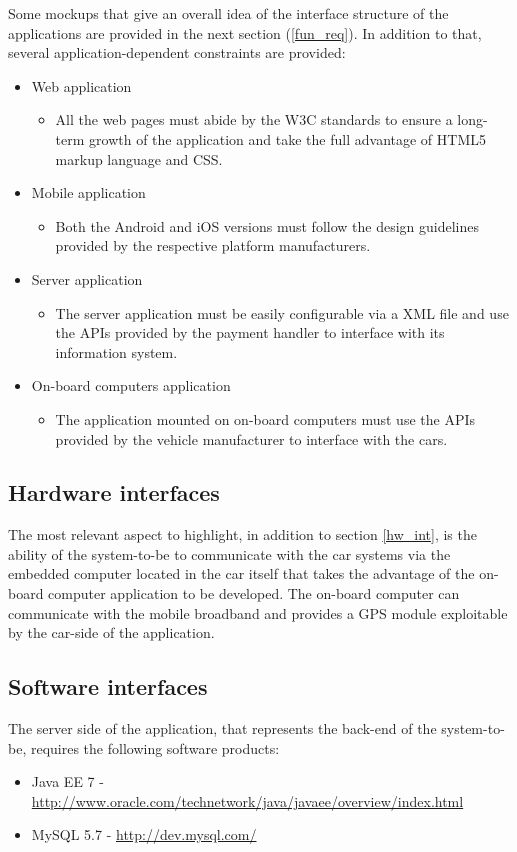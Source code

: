 Some mockups that give an overall idea of the interface structure of the applications are provided in the next section (\ref{fun_req}).
In addition to that, several application-dependent constraints are provided:
\begin{itemize}
\item Web application
	\begin{itemize}
	\item[] All the web pages must abide by the W3C standards to ensure a long-term growth of the application and take the full advantage of HTML5 markup language and CSS.
	\end{itemize}
\item Mobile application
	\begin{itemize}
	\item[] Both the Android and iOS versions must follow the design guidelines provided by the respective platform manufacturers.
	\end{itemize}
\item Server application
	\begin{itemize}
	\item[] The server application must be easily configurable via a XML file and use the APIs provided by the payment handler to interface with its information system.
	\end{itemize}
\item On-board computers application
	\begin{itemize}
	\item[] The application mounted on on-board computers must use the APIs provided by the vehicle manufacturer to interface with the cars.
	\end{itemize}
\end{itemize}

\subsection{Hardware interfaces}
The most relevant aspect to highlight, in addition to section \ref{hw_int}, is the ability of the system-to-be to communicate with the car systems via the embedded computer located in the car itself that takes the advantage of the on-board computer application to be developed. The on-board computer can communicate with the mobile broadband and provides a GPS module exploitable by the car-side of the application.

\subsection{Software interfaces}
The server side of the application, that represents the back-end of the system-to-be, requires the following software products:
\begin{itemize}
\item Java EE 7 - \url{http://www.oracle.com/technetwork/java/javaee/overview/index.html}
\item MySQL 5.7 - \url{http://dev.mysql.com/}
\end{itemize}

